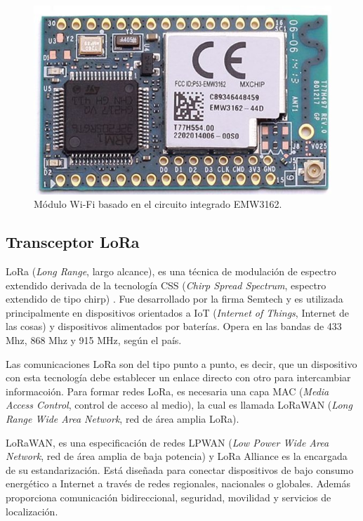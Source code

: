 \begin{figure}[h]
	\centering
	\includegraphics[scale=0.25]{./Figures/wifi_module.jpg}
	\caption{Módulo Wi-Fi basado en el circuito integrado EMW3162\protect\footnotemark.}
	\label{fig:cuadradoAzul}
\end{figure}


\subsection{Transceptor LoRa}

LoRa (\textit{Long Range}, largo alcance), es una técnica de modulación de espectro extendido derivada de la tecnología CSS (\textit{Chirp Spread Spectrum}, espectro extendido de tipo chirp) \citep{WEBSITE:9}. Fue desarrollado por la firma Semtech y es utilizada principalmente en dispositivos orientados a IoT (\textit{Internet of Things}, Internet de las cosas) y dispositivos alimentados por baterías. Opera en las bandas de 433 Mhz, 868 Mhz y 915 MHz, según el país.

Las comunicaciones LoRa son del tipo punto a punto, es decir, que un dispositivo con esta tecnología debe establecer un enlace directo con otro para intercambiar informacoión. Para formar redes LoRa, es necesaria una capa MAC (\textit{Media Access Control}, control de acceso al medio), la cual es llamada LoRaWAN (\textit{Long Range Wide Area Network}, red de área amplia LoRa).

LoRaWAN, es una especificación de redes LPWAN (\textit{Low Power Wide Area Network}, red de área amplia de baja potencia) y LoRa Alliance es la encargada de su estandarización. Está diseñada para conectar dispositivos de bajo consumo energético a Internet a través de redes regionales, nacionales o globales. Además proporciona comunicación bidireccional, seguridad, movilidad y servicios de localización\citep{WEBSITE:10}.

